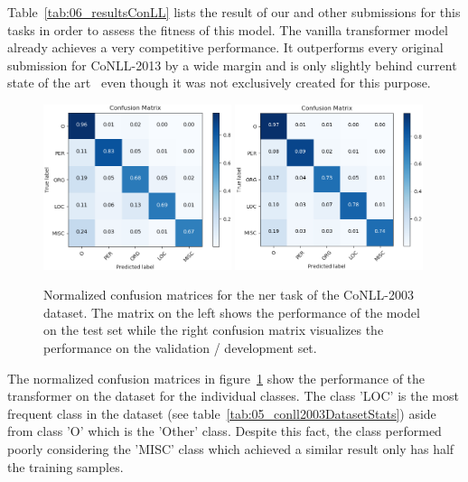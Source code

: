 \bigskip
Table~\ref{tab:06_resultsConLL} lists the result of our and other submissions for this tasks in order to assess the fitness of this model. The vanilla transformer model already achieves a very competitive performance. It outperforms every original submission for CoNLL-2013 by a wide margin and is only slightly behind current state of the art~\cite{Baevski2019} even though it was not exclusively created for this purpose.
\medskip

\begin{figure}[ht]
	\centering
	\includegraphics[width=0.49\textwidth]{figures/06_results/06_ner_final_test_c_matrix}
	\includegraphics[width=0.49\textwidth]{figures/06_results/06_ner_final_valid_c_matrix}
	\caption{Normalized confusion matrices for the \gls{ner} task of the CoNLL-2003 dataset. The matrix on the left shows the performance of the model on the test set while the right confusion matrix visualizes the performance on the validation / development set.}
	\label{fig:06_NER_cmatrices}
\end{figure}

The normalized confusion matrices in figure~\ref{fig:06_NER_cmatrices} show the performance of the transformer on the dataset for the individual classes. The class 'LOC' is the most frequent class in the dataset {(see table~\ref{tab:05_conll2003DatasetStats})} aside from class 'O' which is the 'Other' class. Despite this fact, the class performed poorly considering the 'MISC' class which achieved a similar result only has half the training samples.



